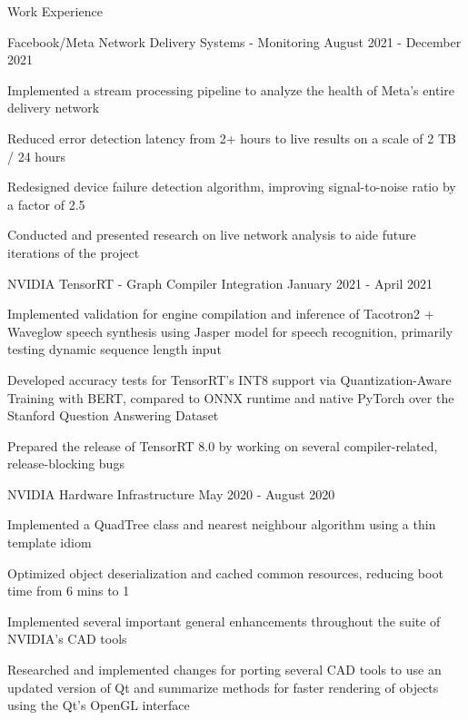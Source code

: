 \documentclass{resume} %
\begin{document}
\begin{rSection}{Work Experience}
    \begin{workexperience}
        {Facebook/Meta}
        {Network Delivery Systems - Monitoring}
        {August 2021 - December 2021}
        {
            \item Implemented a stream processing pipeline to analyze the health of Meta's entire delivery network
            \item Reduced error detection latency from 2+ hours to live results on a scale of 2 TB / 24 hours
            \item Redesigned device failure detection algorithm, improving signal-to-noise ratio by a factor of 2.5
            \item Conducted and presented research on live network analysis to aide future iterations of the project
        }
    \end{workexperience}

    \begin{workexperience}
        {NVIDIA}
        {TensorRT - Graph Compiler Integration}
        {January 2021 - April 2021}
        {
            \item Implemented validation for engine compilation and inference of Tacotron2 + Waveglow speech synthesis using Jasper model for speech recognition, primarily testing dynamic sequence length input
            \item Developed accuracy tests for TensorRT's INT8 support via Quantization-Aware Training with BERT, compared to ONNX runtime and native PyTorch over the Stanford Question Answering Dataset
            \item Prepared the release of TensorRT 8.0 by working on several compiler-related, release-blocking bugs
        }
    \end{workexperience}
    \begin{workexperience}
        {NVIDIA}
        {Hardware Infrastructure}
        {May 2020 - August 2020}
        {
            \item Implemented a QuadTree class and nearest neighbour algorithm using a thin template idiom
            \item Optimized object deserialization and cached common resources, reducing boot time from 6 mins to 1
            \item Implemented several important general enhancements throughout the suite of NVIDIA's CAD tools
            \item Researched and implemented changes for porting several CAD tools to use an updated version of Qt and summarize methods for faster rendering of objects using the Qt's OpenGL interface
        }
    \end{workexperience}
    

\end{rSection}
\end{document}
